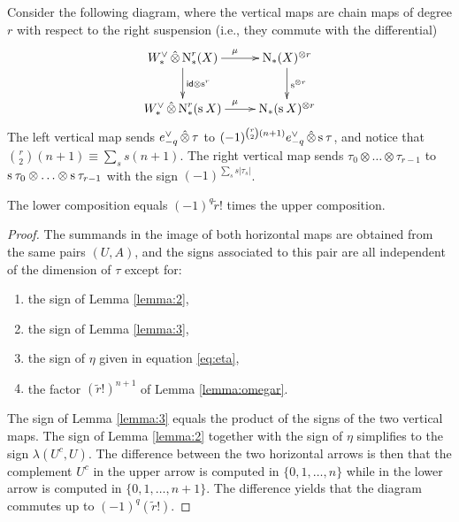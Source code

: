 Consider the following diagram, where the vertical maps are chain maps of degree $r$ with respect to the right suspension (i.e., they commute with the differential)
\[
\xymatrix{
	\Wd\hotimes \rchains(X)\ar[r]^{\mu}\ar[d]^{\id\otimes \sus{r}} & \chains(X)^{\otimes r} \ar[d]^{\sus{\otimes r}}
	\\
	\Wd\hotimes \rchains(\sus{} X)\ar[r]^{\mu} & \chains(\sus{}X)^{\otimes r}	
}
\]
The left vertical map sends $e_{-q}^\vee\operatorname{\hat{\otimes}} \tau$ to $(-1)^{\binom{r}{2}(n+1)}e_{-q}^\vee\operatorname{\hat{\otimes}} \operatorname{s}^{}\tau$, and notice that $\binom{r}{2}(n+1) \equiv \sum_s s(n+1)$. The right vertical map sends $\tau_0\otimes \ldots\otimes \tau_{r-1}$ to $\operatorname{s}^{}\tau_0\otimes \ldots\otimes \operatorname{s}^{}\tau_{r-1}$ with the sign $(-1)^{\sum_s s|\tau_{s}|}$. 
\begin{lemma} The lower composition equals $(-1)^q\tilde{r}!$ times the upper composition.
\end{lemma}
\begin{proof}
The summands in the image of both horizontal maps are obtained from the same pairs $(U,A)$, and the signs associated to this pair are all independent of the dimension of $\tau$ except for:
\begin{enumerate}
	\item the sign of Lemma \ref{lemma:2},
	\item the sign of Lemma \ref{lemma:3},
	\item the sign of $\eta$ given in equation \ref{eq:eta},
	\item the factor $(\tilde{r}!)^{n+1}$ of Lemma \ref{lemma:omegar}.
\end{enumerate}
The sign of Lemma \ref{lemma:3} equals the product of the signs of the two vertical maps. The sign of Lemma \ref{lemma:2} together with the sign of $\eta$ simplifies to the sign $\lambda(U^c,U)$. The difference between the two horizontal arrows is then that the complement $U^c$ in the upper arrow is computed in $\{0,1,\ldots,n\}$ while in the lower arrow is computed in $\{0,1,\ldots,n+1\}$. The difference yields that the diagram commutes up to $(-1)^q(\tilde{r}!)$. 
\end{proof}

